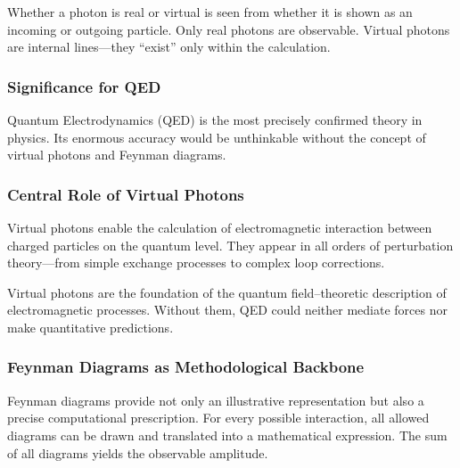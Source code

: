 \begin{tcolorbox}[didaktikbox, title=Real or Virtual Photons in the Diagram]
	\label{box:Reale oder virtuelle Photonen}
	Whether a photon is real or virtual is seen from whether it is shown as an incoming or outgoing particle. Only real photons are observable. Virtual photons are internal lines—they “exist” only within the calculation.
\end{tcolorbox}

\newpage
\noindent
\subsubsection{Significance for QED}

Quantum Electrodynamics (QED) is the most precisely confirmed theory in physics. Its enormous accuracy would be unthinkable without the concept of virtual photons and Feynman diagrams.
\subsubsection*{Central Role of Virtual Photons}
Virtual photons enable the calculation of electromagnetic interaction between charged particles on the quantum level. They appear in all orders of perturbation theory—from simple exchange processes to complex loop corrections.

\vspace{1em}
\begin{tcolorbox}[physikbox, title=No QED Without Virtual Photons]
	\label{box:Ohne virtuelle Photonen keine}
	Virtual photons are the foundation of the quantum field–theoretic description of electromagnetic processes. Without them, QED could neither mediate forces nor make quantitative predictions.
\end{tcolorbox}

\subsubsection*{Feynman Diagrams as Methodological Backbone}
Feynman diagrams provide not only an illustrative representation but also a precise computational prescription. For every possible interaction, all allowed diagrams can be drawn and translated into a mathematical expression. The sum of all diagrams yields the observable amplitude.

